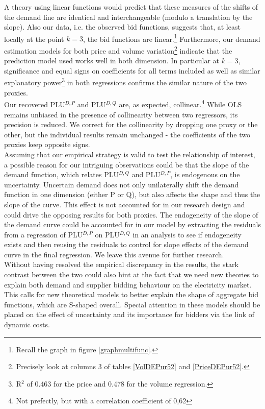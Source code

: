 A theory using linear functions would predict that these measures of the shifts of the demand line are identical and interchangeable (modulo a translation by the slope). Also our data, i.e. the observed bid functions,  suggests that, at least locally at the point $k=3$, the bid functions are linear.\footnote{Recall the graph in figure \ref{graphmultifunc}.} Furthermore, our demand estimation models for both price and volume variation\footnote{Precisely look at columns 3 of tables \ref{VolDEPur52} and \ref{PriceDEPur52}.} indicate that the prediction model used works well in both dimension. In particular at $k=3$, significance and equal signs on coefficients for all terms included as well as similar explanatory power\footnote{R$^2$ of 0.463 for the price  and 0.478 for the volume regression.} in both regressions confirms the similar nature of the two proxies. \\

Our recovered PLU$^{D,P}$ and PLU$^{D,Q}$ are, as expected, collinear.\footnote{Not prefectly, but with a correlation coefficient of 0,62} While OLS remains unbiased in the presence of collinearity between two regressors, its precision is reduced. We correct for the collinearity by dropping one proxy or the other, but the individual results remain unchanged - the coefficients of the two proxies keep opposite signs. \\

Assuming that our empirical strategy is valid to test the relationship of interest, a possible reason for our intriguing observations could be that the slope of the demand function, which relates PLU$^{D,Q}$ and PLU$^{D,P}$, is endogenous on the uncertainty. Uncertain demand does not only unilaterally shift the demand function in one dimension (either P or Q), but also affects the shape and thus the slope of the curve. This effect is not accounted for in our research design and could drive the opposing results for both proxies. The endogeneity of the slope of the demand curve could be accounted for in our model by extracting the residuals from a regression of PLU$^{D,P}$ on PLU$^{D,Q}$ in an analysis to see if endogeneity exists and then reusing the residuals to control for slope effects of the demand curve in the final regression. We leave this  avenue for further research. \\

Without having resolved the empirical discrepancy in the results, the stark contrast between the two could also hint at the fact that we need new theories to explain both demand and supplier bidding behaviour on the electricity market. This calls for new theoretical models to better explain the shape of aggregate bid functions, which are S-shaped overall. Special attention in these models should be placed on the effect of uncertainty and its importance for bidders via the link of dynamic costs. \\

